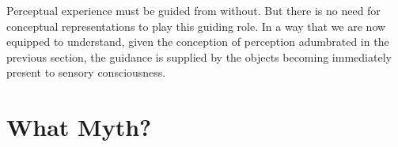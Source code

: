 \documentclass[12pt]{article}
\begin{document}
Perceptual experience must be guided from without. But there is no need for conceptual representations to play this guiding role. In a way that we are now equipped to understand, given the conception of perception adumbrated in the previous section, the guidance is supplied by the objects becoming immediately present to sensory consciousness.

\section{What Myth?} %
\label{sec:what_myth_}


 
 
\end{document}
